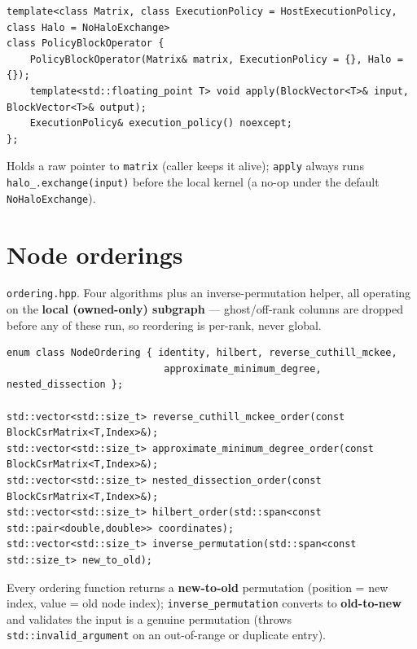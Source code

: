 \documentclass[11pt,a4paper]{report}
\begin{document}
\begin{lstlisting}
template<class Matrix, class ExecutionPolicy = HostExecutionPolicy, class Halo = NoHaloExchange>
class PolicyBlockOperator {
    PolicyBlockOperator(Matrix& matrix, ExecutionPolicy = {}, Halo = {});
    template<std::floating_point T> void apply(BlockVector<T>& input, BlockVector<T>& output);
    ExecutionPolicy& execution_policy() noexcept;
};
\end{lstlisting}

Holds a raw pointer to \lstinline!matrix! (caller keeps it alive); \lstinline!apply!
always runs \lstinline!halo_.exchange(input)! before the local kernel (a no-op
under the default \lstinline!NoHaloExchange!).

\section{Node orderings}
\label{sec:4.3}

\texttt{ordering.hpp}. Four algorithms plus an inverse-permutation
helper, all operating on the \textbf{local (owned-only) subgraph} ---
ghost/off-rank columns are dropped before any of these run, so
reordering is per-rank, never global.

\begin{lstlisting}
enum class NodeOrdering { identity, hilbert, reverse_cuthill_mckee,
                           approximate_minimum_degree, nested_dissection };

std::vector<std::size_t> reverse_cuthill_mckee_order(const BlockCsrMatrix<T,Index>&);
std::vector<std::size_t> approximate_minimum_degree_order(const BlockCsrMatrix<T,Index>&);
std::vector<std::size_t> nested_dissection_order(const BlockCsrMatrix<T,Index>&);
std::vector<std::size_t> hilbert_order(std::span<const std::pair<double,double>> coordinates);
std::vector<std::size_t> inverse_permutation(std::span<const std::size_t> new_to_old);
\end{lstlisting}

Every ordering function returns a \textbf{new-to-old} permutation
(position = new index, value = old node index); \lstinline!inverse_permutation!
converts to \textbf{old-to-new} and validates the input is a genuine
permutation (throws \lstinline!std::invalid_argument! on an out-of-range or
duplicate entry).
\end{document}
